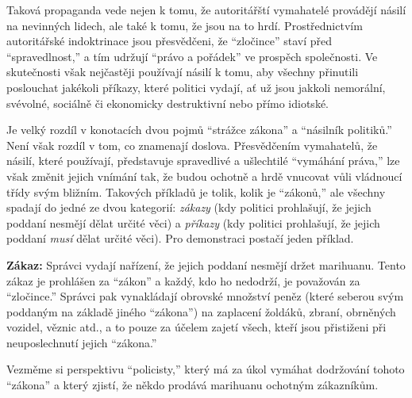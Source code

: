\documentclass{book}
\begin{document}
Taková propaganda vede nejen k tomu, že autoritářští vymahatelé provádějí násilí na nevinných lidech, ale také k tomu, že jsou na to hrdí. Prostřednictvím autoritářské indoktrinace jsou přesvědčeni, že \enquote{zločince} staví před \enquote{spravedlnost,} a tím udržují \enquote{právo a pořádek} ve prospěch společnosti. Ve skutečnosti však nejčastěji používají násilí k tomu, aby všechny přinutili poslouchat jakékoli příkazy, které politici vydají, ať už jsou jakkoli nemorální, svévolné, sociálně či ekonomicky destruktivní nebo přímo idiotské.

Je velký rozdíl v konotacích dvou pojmů \enquote{strážce zákona} a \enquote{násilník politiků.} Není však rozdíl v tom, co znamenají doslova. Přesvědčením vymahatelů, že násilí, které používají, představuje spravedlivé a ušlechtilé \enquote{vymáhání práva,} lze však změnit jejich vnímání tak, že budou ochotně a hrdě vnucovat vůli vládnoucí třídy svým bližním. Takových příkladů je tolik, kolik je \enquote{zákonů,} ale všechny spadají do jedné ze dvou kategorií: \emph{zákazy} (kdy politici prohlašují, že jejich poddaní nesmějí dělat určité věci) a \emph{příkazy} (kdy politici prohlašují, že jejich poddaní \emph{musí} dělat určité věci). Pro demonstraci postačí jeden příklad.

\textbf{Zákaz:} Správci vydají nařízení, že jejich poddaní nesmějí držet marihuanu. Tento zákaz je prohlášen za \enquote{zákon} a každý, kdo ho nedodrží, je považován za \enquote{zločince.} Správci pak vynakládají obrovské množství peněz (které seberou svým poddaným na základě jiného \enquote{zákona}) na zaplacení žoldáků, zbraní, obrněných vozidel, věznic atd., a to pouze za účelem zajetí všech, kteří jsou přistiženi při neuposlechnutí jejich \enquote{zákona.}

Vezměme si perspektivu \enquote{policisty,} který má za úkol vymáhat dodržování tohoto \enquote{zákona} a který zjistí, že někdo prodává marihuanu ochotným zákazníkům.
\end{document}
